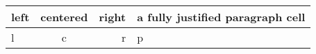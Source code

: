 \documentclass{article}
\begin{document}
\begin{tabular}{|l|c|r|p{1.7cm}|}
  \hline
  left & centered & right & a fully justified paragraph cell\\
  \hline
  l & c & r & p\\
  \hline
\end{tabular}
\end{document}

